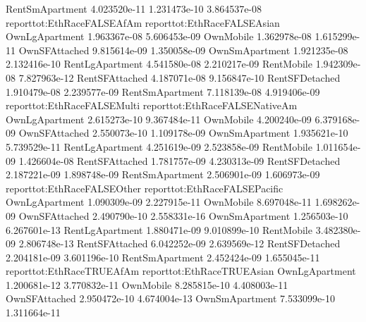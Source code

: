 \documentclass{article}
\begin{document}
\begin{Schunk}
\begin{Soutput}
RentSmApartment  4.023520e-11 1.231473e-10 3.864537e-08
                reporttot:EthRaceFALSEAfAm reporttot:EthRaceFALSEAsian
OwnLgApartment                1.963367e-08                5.606453e-09
OwnMobile                     1.362978e-08                1.615299e-11
OwnSFAttached                 9.815614e-09                1.350058e-09
OwnSmApartment                1.921235e-08                2.132416e-10
RentLgApartment               4.541580e-08                2.210217e-09
RentMobile                    1.942309e-08                7.827963e-12
RentSFAttached                4.187071e-08                9.156847e-10
RentSFDetached                1.910479e-08                2.239577e-09
RentSmApartment               7.118139e-08                4.919406e-09
                reporttot:EthRaceFALSEMulti reporttot:EthRaceFALSENativeAm
OwnLgApartment                 2.615273e-10                   9.367484e-11
OwnMobile                      4.200240e-09                   6.379168e-09
OwnSFAttached                  2.550073e-10                   1.109178e-09
OwnSmApartment                 1.935621e-10                   5.739529e-11
RentLgApartment                4.251619e-09                   2.523858e-09
RentMobile                     1.011654e-09                   1.426604e-08
RentSFAttached                 1.781757e-09                   4.230313e-09
RentSFDetached                 2.187221e-09                   1.898748e-09
RentSmApartment                2.506901e-09                   1.606973e-09
                reporttot:EthRaceFALSEOther reporttot:EthRaceFALSEPacific
OwnLgApartment                 1.090309e-09                  2.227915e-11
OwnMobile                      8.697048e-11                  1.698262e-09
OwnSFAttached                  2.490790e-10                  2.558331e-16
OwnSmApartment                 1.256503e-10                  6.267601e-13
RentLgApartment                1.880471e-09                  9.010899e-10
RentMobile                     3.482380e-09                  2.806748e-13
RentSFAttached                 6.042252e-09                  2.639569e-12
RentSFDetached                 2.204181e-09                  3.601196e-10
RentSmApartment                2.452424e-09                  1.655045e-11
                reporttot:EthRaceTRUEAfAm reporttot:EthRaceTRUEAsian
OwnLgApartment               1.200681e-12               3.770832e-11
OwnMobile                    8.285815e-10               4.408003e-11
OwnSFAttached                2.950472e-10               4.674004e-13
OwnSmApartment               7.533099e-10               1.311664e-11

\end{Soutput}
\end{Schunk}
\end{document}
